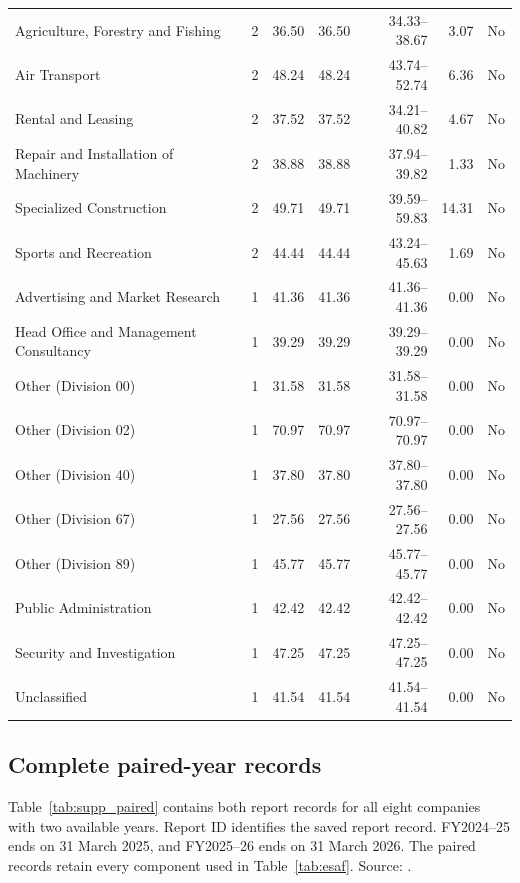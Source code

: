 {\begin{longtable}{@{}L{6.0cm}rrrrrr@{}}
Agriculture, Forestry and Fishing & 2 & 36.50 & 36.50 & 34.33--38.67 & 3.07 & No \\
Air Transport & 2 & 48.24 & 48.24 & 43.74--52.74 & 6.36 & No \\
Rental and Leasing & 2 & 37.52 & 37.52 & 34.21--40.82 & 4.67 & No \\
Repair and Installation of Machinery & 2 & 38.88 & 38.88 & 37.94--39.82 & 1.33 & No \\
Specialized Construction & 2 & 49.71 & 49.71 & 39.59--59.83 & 14.31 & No \\
Sports and Recreation & 2 & 44.44 & 44.44 & 43.24--45.63 & 1.69 & No \\
Advertising and Market Research & 1 & 41.36 & 41.36 & 41.36--41.36 & 0.00 & No \\
Head Office and Management Consultancy & 1 & 39.29 & 39.29 & 39.29--39.29 & 0.00 & No \\
Other (Division 00) & 1 & 31.58 & 31.58 & 31.58--31.58 & 0.00 & No \\
Other (Division 02) & 1 & 70.97 & 70.97 & 70.97--70.97 & 0.00 & No \\
Other (Division 40) & 1 & 37.80 & 37.80 & 37.80--37.80 & 0.00 & No \\
Other (Division 67) & 1 & 27.56 & 27.56 & 27.56--27.56 & 0.00 & No \\
Other (Division 89) & 1 & 45.77 & 45.77 & 45.77--45.77 & 0.00 & No \\
Public Administration & 1 & 42.42 & 42.42 & 42.42--42.42 & 0.00 & No \\
Security and Investigation & 1 & 47.25 & 47.25 & 47.25--47.25 & 0.00 & No \\
Unclassified & 1 & 41.54 & 41.54 & 41.54--41.54 & 0.00 & No \\
\end{longtable}}

\clearpage
\subsection{Complete paired-year records}

Table~\ref{tab:supp_paired} contains both report records for all eight companies with two available years. Report ID identifies the saved report record. FY2024--25 ends on 31 March 2025, and FY2025--26 ends on 31 March 2026. The paired records retain every component used in Table~\ref{tab:esaf}. Source: .

